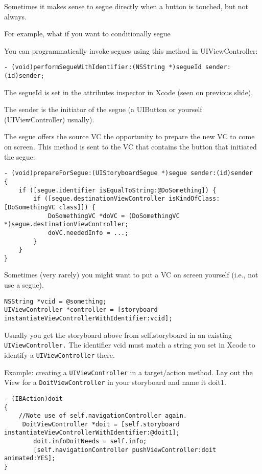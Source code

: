 \documentclass[12pt]{article}
\newcommand{\co}{\texttt}
\begin{document}
Sometimes it makes sense to segue directly when a button is touched, but not always.

For example, what if you want to conditionally segue

You can programmatically invoke segues using this method in UIViewController:

\begin{lstlisting}
- (void)performSegueWithIdentifier:(NSString *)segueId sender:(id)sender;
\end{lstlisting}

The segueId is set in the attributes inspector in Xcode (seen on previous slide).

The sender is the initiator of the segue (a UIButton or yourself (UIViewController) usually).

The segue offers the source VC the opportunity to prepare the new VC to come on screen. This method is sent to the VC that contains the button that initiated the segue:
\begin{lstlisting}
- (void)prepareForSegue:(UIStoryboardSegue *)segue sender:(id)sender 
{
    if ([segue.identifier isEqualToString:@DoSomething]) {
        if ([segue.destinationViewController isKindOfClass:[DoSomethingVC class]]) {
            DoSomethingVC *doVC = (DoSomethingVC *)segue.destinationViewController;
            doVC.neededInfo = ...; 
        }
    } 
}
\end{lstlisting}

Sometimes (very rarely) you might want to put a VC on screen yourself (i.e., not use a segue). 
\begin{lstlisting}
NSString *vcid = @something;
UIViewController *controller = [storyboard instantiateViewControllerWithIdentifier:vcid]; 
\end{lstlisting}
Usually you get the storyboard above from self.storyboard in an existing \co{UIViewController.} The identifier vcid must match a string you set in Xcode to identify a \co{UIViewController} there.

Example: creating a \co{UIViewController} in a target/action method. Lay out the View for a \co{DoitViewController} in your storyboard and name it doit1.
\begin{lstlisting}
- (IBAction)doit
{
	//Note use of self.navigationController again.
	 DoitViewController *doit = [self.storyboard instantiateViewControllerWithIdentifier:@doit1];
    	doit.infoDoitNeeds = self.info;
    	[self.navigationController pushViewController:doit animated:YES];
}
\end{lstlisting}
\end{document}
